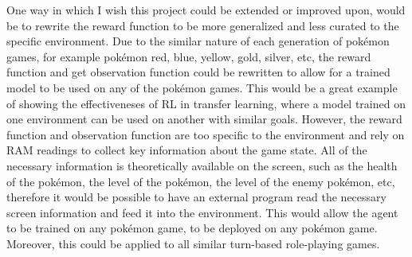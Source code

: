 One way in which I wish this project could be extended or improved upon, would be to rewrite the reward function to be more generalized and less curated to the specific environment. Due to the similar nature of each generation of pokémon games, for example pokémon red, blue, yellow, gold, silver, etc, the reward function and get observation function could be rewritten to allow for a trained model to be used on any of the pokémon games. This would be a great example of showing the effectiveneses of RL in transfer learning, where a model trained on one environment can be used on another with similar goals. However, the reward function and observation function are too specific to the environment and rely on RAM readings to collect key information about the game state. All of the necessary information is theoretically available on the screen, such as the health of the pokémon, the level of the pokémon, the level of the enemy pokémon, etc, therefore it would be possible to have an external program read the necessary screen information and feed it into the environment. This would allow the agent to be trained on any pokémon game, to be deployed on any pokémon game. Moreover, this could be applied to all similar turn-based role-playing games. 